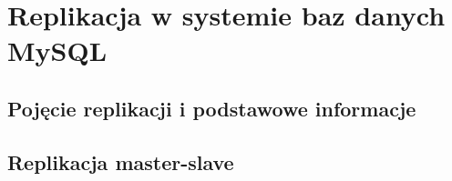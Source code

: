 \chapter{Replikacja w systemie baz danych MySQL}

\section{Pojęcie replikacji i podstawowe informacje}

\section{Replikacja master-slave}


